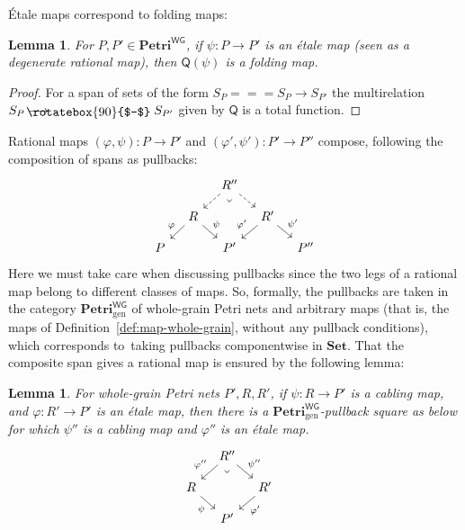 \documentclass[11pt,a4paper]{article}
\theoremstyle{plain}
\newtheorem{lemma}[theorem]{Lemma}
\theoremstyle{definition}
\theoremstyle{remark}
\newcommand{\WGPetri}{\mathbf{Petri}^{\mathsf{WG}}}
\newcommand{\Q}{\mathsf{Q}}
\newcommand{\Set}{\mathbf{Set}}
\newcommand{\profto}{\mathrel{\ooalign{$\longrightarrow$\cr\hfil\!\raisebox{-1.2pt}{\rotatebox{90}{$-$}}\hfil\cr}}}
\begin{document}
\'Etale maps correspond to folding maps:
\begin{lemma}
\label{lemma:folding}
    For $P, P' \in \WGPetri$, if $\psi : P \rightarrow P'$ is an \'etale map (seen as a degenerate rational map), then $\Q(\psi)$ is a folding map. 
\end{lemma}
\begin{proof}
For a span of sets of the form $S_P =\!\!=\!\!= S_P \to S_{P'}$ the multirelation $S_P \profto S_{P'}$ given by $\Q$ is a total function.
\end{proof}






Rational maps $(\varphi, \psi) : P \to P'$ and $(\varphi', \psi') : P' \to P''$ compose, following the composition of spans as pullbacks:
\[\begin{tikzcd}[row sep=1em, column sep=1em]
	&& {R''} && \\
	& R && {R'} \\
	P && {P'} && {P''}
	\arrow[dashed, from=1-3, to=2-2]
	\arrow[dashed, from=1-3, to=2-4]
	\arrow["\lrcorner"{anchor=center, pos=0.125, rotate=-45}, draw=none, from=1-3, to=3-3]
	\arrow["\varphi"', from=2-2, to=3-1]
	\arrow["\psi", from=2-2, to=3-3]
	\arrow["{\varphi'}"', from=2-4, to=3-3]
	\arrow["{\psi'}", from=2-4, to=3-5]
\end{tikzcd}\]
Here we must take care when discussing pullbacks since the two legs of a rational map belong to different classes of maps. So, formally, the pullbacks are taken in the category $\WGPetri_{\mathrm{gen}}$ of whole-grain Petri nets and arbitrary maps (that is, the maps of Definition~\ref{def:map-whole-grain}, without any pullback conditions), which corresponds to taking pullbacks componentwise in $\Set$. 
That the composite span gives a rational map is ensured by the following lemma:
\begin{lemma}
	\label{lem:pullback-cabling-etale}
 For whole-grain Petri nets $P', R, R'$, if $\psi : R \rightarrow P'$ is a cabling map, and $\varphi : R' \rightarrow P'	$ is an \'etale map, then there is a $\WGPetri_{\mathrm{gen}}$-pullback square as below for which $\psi''$ is a cabling map and $\varphi''$ is an \'etale map.
 \[\begin{tikzcd}[row sep=1em, column sep=1em]
	&& {R''} && \\
	& R && {R'} \\
	 && {P'} &&
	\arrow["{\varphi''}"', from=1-3, to=2-2]
	\arrow["{\psi''}", from=1-3, to=2-4]
	\arrow["\lrcorner"{anchor=center, pos=0.125, rotate=-45}, draw=none, from=1-3, to=3-3]
	\arrow["\psi"', from=2-2, to=3-3]
	\arrow["{\varphi'}", from=2-4, to=3-3]
\end{tikzcd}\]
\end{lemma}
\end{document}
